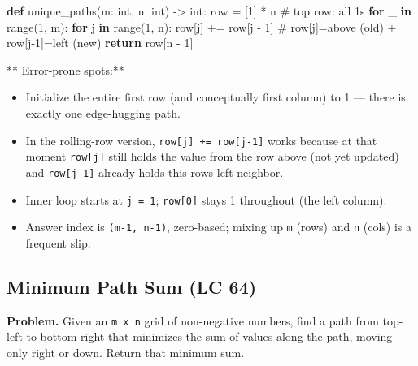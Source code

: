 \documentclass[11pt]{article}
\providecommand{\tightlist}{\setlength{\itemsep}{1pt}\setlength{\parskip}{0pt}}
\newenvironment{Shaded}{\begin{snugshade}}{\end{snugshade}}
\newcommand{\BuiltInTok}[1]{\textcolor[rgb]{0.50,0.55,0.55}{#1}}
\newcommand{\CommentTok}[1]{\textcolor[rgb]{0.48,0.49,0.49}{#1}}
\newcommand{\ControlFlowTok}[1]{\textcolor[rgb]{0.99,0.74,0.29}{\textbf{#1}}}
\newcommand{\DecValTok}[1]{\textcolor[rgb]{0.96,0.45,0.00}{#1}}
\newcommand{\KeywordTok}[1]{\textcolor[rgb]{0.81,0.81,0.76}{\textbf{#1}}}
\newcommand{\NormalTok}[1]{\textcolor[rgb]{0.81,0.81,0.76}{#1}}
\newcommand{\OperatorTok}[1]{\textcolor[rgb]{0.81,0.81,0.76}{#1}}
\begin{document}
\begin{Shaded}
\begin{Highlighting}[]
\KeywordTok{def}\NormalTok{ unique\_paths(m: }\BuiltInTok{int}\NormalTok{, n: }\BuiltInTok{int}\NormalTok{) }\OperatorTok{{-}\textgreater{}} \BuiltInTok{int}\NormalTok{:}
\NormalTok{    row }\OperatorTok{=}\NormalTok{ [}\DecValTok{1}\NormalTok{] }\OperatorTok{*}\NormalTok{ n                 }\CommentTok{\# top row: all 1s}
    \ControlFlowTok{for}\NormalTok{ \_ }\KeywordTok{in} \BuiltInTok{range}\NormalTok{(}\DecValTok{1}\NormalTok{, m):}
        \ControlFlowTok{for}\NormalTok{ j }\KeywordTok{in} \BuiltInTok{range}\NormalTok{(}\DecValTok{1}\NormalTok{, n):}
\NormalTok{            row[j] }\OperatorTok{+=}\NormalTok{ row[j }\OperatorTok{{-}} \DecValTok{1}\NormalTok{]  }\CommentTok{\# row[j]=above (old) + row[j{-}1]=left (new)}
    \ControlFlowTok{return}\NormalTok{ row[n }\OperatorTok{{-}} \DecValTok{1}\NormalTok{]}
\end{Highlighting}
\end{Shaded}

** Error-prone spots:**

\begin{itemize}
\tightlist
\item
  Initialize the entire first row (and conceptually first column) to 1 --- there is exactly one edge-hugging path.
\item
  In the rolling-row version, \texttt{row{[}j{]}\ +=\ row{[}j-1{]}} works because at that moment \texttt{row{[}j{]}} still holds the value from the row above (not yet updated) and \texttt{row{[}j-1{]}} already holds this row\textquotesingle s left neighbor.
\item
  Inner loop starts at \texttt{j\ =\ 1}; \texttt{row{[}0{]}} stays 1 throughout (the left column).
\item
  Answer index is \texttt{(m-1,\ n-1)}, zero-based; mixing up \texttt{m} (rows) and \texttt{n} (cols) is a frequent slip.
\end{itemize}

\subsection{Minimum Path Sum (LC 64)}\label{minimum-path-sum-lc-64}

\textbf{Problem.} Given an \texttt{m\ x\ n} grid of non-negative numbers, find a path from top-left to bottom-right that minimizes the sum of values along the path, moving only right or down. Return that minimum sum.
\end{document}
